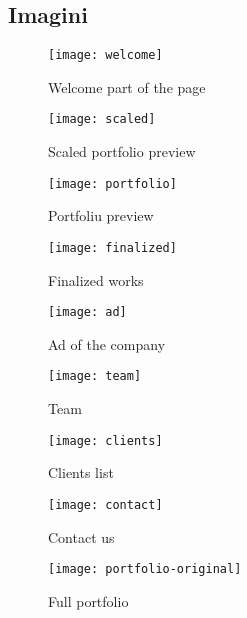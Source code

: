 \subsection{Imagini}
\begin{center}	
	\begin{figure}[h]
		\centering
		\texttt{[image: welcome]}\\
		\caption{Welcome part of the page}
		\label{welcome}
	\end{figure}
	
	\begin{figure}[h]
		\centering
		\texttt{[image: scaled]}\\
		\caption{Scaled portfolio preview}
		\label{scaled}
	\end{figure}
	
	\begin{figure}[h]
		\centering
		\texttt{[image: portfolio]}\\
		\caption{Portfoliu preview}
		\label{portfolio}
	\end{figure}
	
	\begin{figure}[h]
		\centering
		\texttt{[image: finalized]}\\
		\caption{Finalized works}
		\label{finalized}
	\end{figure}
	
	\begin{figure}[h]
		\centering
		\texttt{[image: ad]}\\
		\caption{Ad of the company}
		\label{ad}
	\end{figure}
	
	\begin{figure}[h]
		\centering
		\texttt{[image: team]}\\
		\caption{Team}
		\label{team}
	\end{figure}
	
	\begin{figure}[h]
		\centering
		\texttt{[image: clients]}\\
		\caption{Clients list}
		\label{clients}
	\end{figure}
	
	\begin{figure}[h]
		\centering
		\texttt{[image: contact]}\\
		\caption{Contact us}
		\label{contact}
	\end{figure}
	
	\begin{figure}[h]
		\centering
		\texttt{[image: portfolio-original]}\\
		\caption{Full portfolio}
		\label{portfolio-original}
	\end{figure}
	

\end{center}

